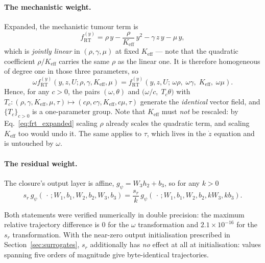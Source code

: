 \paragraph{The mechanistic weight.}
Expanded, the mechanistic tumour term is
\begin{equation}
\label{eq:frt_expanded}
f^{(y)}_{\mathrm{RT}}
= \rho\,y - \frac{\rho}{K_{\mathrm{eff}}}\,y^{2} - \gamma\,z\,y - \mu\,y ,
\end{equation}
which is \emph{jointly linear} in $(\rho,\gamma,\mu)$ at fixed
$K_{\mathrm{eff}}$ --- note that the quadratic coefficient $\rho/K_{\mathrm{eff}}$
carries the same $\rho$ as the linear one. It is therefore homogeneous of degree
one in those three parameters, so
\begin{equation}
\label{eq:omega_gauge}
\omega f^{(y)}_{\mathrm{RT}}(y,z,U;\rho,\gamma,K_{\mathrm{eff}},\mu)
=
f^{(y)}_{\mathrm{RT}}\!\left(y,z,U;\,\omega\rho,\;\omega\gamma,\;K_{\mathrm{eff}},\;\omega\mu\right).
\end{equation}
Hence, for any $c>0$, the pairs $(\omega,\theta)$ and
$\bigl(\omega/c,\;T_{c}\theta\bigr)$ with
$T_{c}:(\rho,\gamma,K_{\mathrm{eff}},\mu,\tau)\mapsto(c\rho,c\gamma,K_{\mathrm{eff}},c\mu,\tau)$
generate the \emph{identical} vector field, and $\{T_{c}\}_{c>0}$ is a
one-parameter group. Note that $K_{\mathrm{eff}}$ must \emph{not} be rescaled:
by Eq.~\eqref{eq:frt_expanded} scaling $\rho$ already scales the quadratic term,
and scaling $K_{\mathrm{eff}}$ too would undo it. The same applies to $\tau$,
which lives in the $\dot z$ equation and is untouched by $\omega$.

\paragraph{The residual weight.}
The closure's output layer is affine, $g_{\psi}=W_{3}h_{2}+b_{3}$, so for any
$k>0$
\begin{equation}
\label{eq:sr_gauge}
s_{r}\,g_{\psi}(\,\cdot\,;W_{1},b_{1},W_{2},b_{2},W_{3},b_{3})
=
\frac{s_{r}}{k}\,g_{\psi}(\,\cdot\,;W_{1},b_{1},W_{2},b_{2},kW_{3},kb_{3}).
\end{equation}

Both statements were verified numerically in double precision: the maximum
relative trajectory difference is $0$ for the $\omega$
transformation and $2.1\times10^{-16}$ for the $s_{r}$ transformation. With the
near-zero output initialisation prescribed in Section~\ref{sec:surrogates},
$s_{r}$ additionally has \emph{no} effect at all at initialisation: values
spanning five orders of magnitude give byte-identical trajectories.

